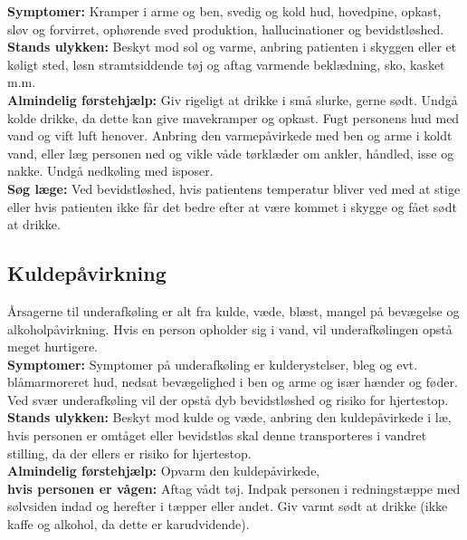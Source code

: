 \documentclass[../../../main.tex]{subfiles}
\begin{document}
\begin{multicols}{2}
\textbf{Symptomer:}
Kramper i arme og ben, svedig og kold hud, hovedpine, opkast, sløv og forvirret, ophørende sved produktion, hallucinationer og bevidstløshed.
\\

\textbf{Stands ulykken:} Beskyt mod sol og varme, anbring patienten i
skyggen eller et køligt sted, løsn stramtsiddende tøj og aftag varmende beklædning, sko, kasket m.m.
\\

\textbf{Almindelig førstehjælp:} Giv rigeligt at drikke i små slurke, gerne sødt. Undgå kolde drikke, da dette kan give mavekramper og opkast. Fugt personens hud med vand og vift luft henover. Anbring den varmepåvirkede med ben og arme i koldt vand, eller læg personen ned og vikle våde tørklæder om ankler, håndled, isse og nakke. Undgå nedkøling med isposer.
\\

\textbf{Søg læge:} Ved bevidstløshed, hvis patientens temperatur bliver
ved med at stige eller hvis patienten ikke får det bedre efter at være kommet i skygge og fået sødt at drikke. 
\\
\subsection*{Kuldepåvirkning} Årsagerne til underafkøling er alt fra kulde, væde,
blæst, mangel på bevægelse og alkoholpåvirkning. Hvis en person opholder sig i vand, vil underafkølingen opstå meget hurtigere.
\\

\textbf{Symptomer:} Symptomer på underafkøling er kulderystelser, bleg
og evt. blåmarmoreret hud, nedsat bevægelighed i ben og arme og især hænder og føder. Ved svær underafkøling vil der opstå dyb bevidstløshed og risiko for hjertestop.
\\

\textbf{Stands ulykken:} Beskyt mod kulde og væde, anbring den kuldepåvirkede i læ, hvis personen er omtåget eller bevidstløs skal denne transporteres i vandret stilling, da der ellers er risiko for hjertestop.
\\

\textbf{Almindelig førstehjælp:} Opvarm den kuldepåvirkede,
\\

\textbf{hvis personen er vågen:} Aftag vådt tøj. Indpak personen i redningstæppe med sølvsiden indad og herefter i tæpper eller andet. Giv varmt sødt at drikke (ikke kaffe og alkohol, da dette er karudvidende).
\\


\end{multicols}
\end{document}
